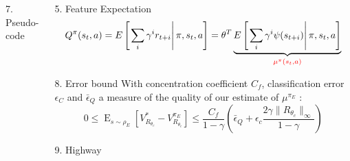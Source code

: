 \documentclass[xcolor=x11names,12pt]{beamer}
\begin{document}
\begin{frame}
\begin{columns}
\begin{column}{.48\textwidth}
\begin{block}{7. Pseudo-code}
{\begin{algorithm}[H]
        \end{algorithm}
      }
    \end{block}
  \end{column}
  \begin{column}{.48\textwidth}
    \begin{block}{5. Feature Expectation}
        \begin{equation*}
          Q^\pi(s_t,a) = E\left[\left.\sum\limits_{i}\gamma^i r_{t+i}\right|\pi,s_t,a\right] = \theta^T\underbrace{E\left[\left.\sum\limits_{i}\gamma^i \psi(s_{t+i})\right|\pi,s_t,a\right]}_{\color{red}\mu^\pi(s_t,a)}
        \end{equation*}
    \end{block}
    \vfill
    \begin{block}{8. Error bound}
      With concentration coefficient $C_f$, classification error $\epsilon_C$ and $\bar{\epsilon}_Q$ a measure of the quality of our estimate of $\mu^{\pi_E}$ :
      \begin{equation*}
        0\leq
        \mathop{E}_{s\sim\rho_E}[V^*_{R_{\theta_c}}-V^{\pi_E}_{R_{\theta_c}}]
        \leq \frac{C_f}{1-\gamma}\left(\bar{\epsilon}_Q +
        \epsilon_c\frac{2\gamma\|R_{\theta_c}\|_\infty}{1-\gamma}
        \right)
      \end{equation*}
    \end{block}
    \vfill
    \begin{block}{9. Highway}
      \begin{columns}
        \begin{column}{0.001\textwidth}
          \vspace{7cm}
        \end{column}
        \begin{column}{\textwidth}
          \centering
          \fontsize{11pt}{11pt}\selectfont

\end{column}
\end{columns}
\end{block}
\end{column}
\end{columns}
\end{frame}
\end{document}
